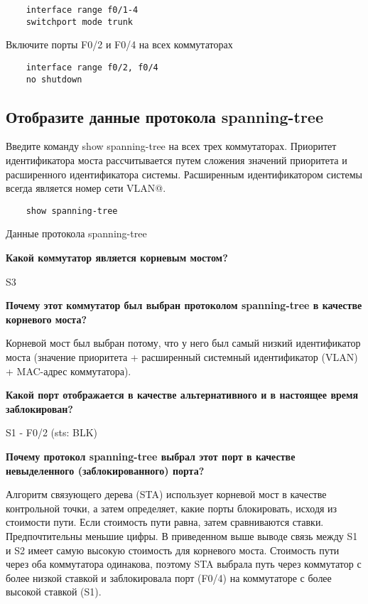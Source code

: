 \begin{verbatim}
	interface range f0/1-4
	switchport mode trunk
\end{verbatim}

Включите порты F0/2 и F0/4 на всех коммутаторах

\begin{verbatim}
	interface range f0/2, f0/4
	no shutdown
\end{verbatim}

\subsection{Отобразите данные протокола spanning-tree}
Введите команду show spanning-tree на всех трех коммутаторах.
Приоритет идентификатора моста рассчитывается путем сложения значений
приоритета и расширенного идентификатора системы.
Расширенным идентификатором системы всегда является номер сети VLAN@.

\begin{verbatim}
    show spanning-tree
\end{verbatim}

\begin{image}
	\caption{Данные протокола spanning-tree}
	\label{fig:spanning_tree}
\end{image}

\textbf{Какой коммутатор является корневым мостом?}

S3

\textbf{Почему этот коммутатор был выбран протоколом spanning-tree
	в качестве корневого моста?}

Корневой мост был выбран потому,
что у него был самый низкий идентификатор моста
(значение приоритета + расширенный системный идентификатор (VLAN) +
MAC-адрес коммутатора).

\textbf{Какой порт отображается в качестве альтернативного
	и в настоящее время заблокирован?}

S1 - F0/2 (sts: BLK)

\textbf{Почему протокол spanning-tree выбрал этот порт
	в качестве невыделенного (заблокированного) порта?}

Алгоритм связующего дерева (STA) использует корневой мост
в качестве контрольной точки, а затем определяет,
какие порты блокировать, исходя из стоимости пути.
Если стоимость пути равна, затем сравниваются ставки.
Предпочтительны меньшие цифры.
В приведенном выше выводе связь между S1 и S2 имеет самую высокую стоимость
для корневого моста.
Стоимость пути через оба коммутатора одинакова,
поэтому STA выбрала путь через коммутатор с более низкой ставкой
и заблокировала порт (F0/4) на коммутаторе с более высокой ставкой (S1).

